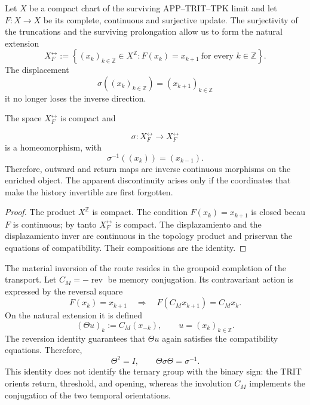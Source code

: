 Let \(X\) be a compact chart of the surviving APP--TRIT--TPK limit and let
\(F:X\to X\) be its complete, continuous and surjective update. The surjectivity of the truncations and the surviving prolongation allow us to form the natural extension
\begin{equation}
 X_F^{\leftrightarrow}
 :=\left\{(x_k)_{k\in\mathbb Z}\in X^{\mathbb Z}:
 F(x_k)=x_{k+1}\ \text{for every }k\in\mathbb Z\right\}.
 \label{p12-83-c19-s1:hmtch:eq-extension-natural-two-way}
\end{equation}
The displacement
\[
 \sigma((x_k)_{k\in\mathbb Z})=(x_{k+1})_{k\in\mathbb Z}
\]
it no longer loses the inverse direction.

\begin{theorem}
\label{p12-83-c19-s1:hmtch:thm-extension-natural-two-way}
The space \(X_F^{\leftrightarrow}\) is compact and

\[
 \sigma:X_F^{\leftrightarrow}\longrightarrow X_F^{\leftrightarrow}
\]
is a homeomorphism, with
\[
 \sigma^{-1}((x_k))=(x_{k-1}).
\]
Therefore, outward and return maps are inverse continuous morphisms on the
enriched object. The apparent discontinuity arises only if the coordinates
that make the history invertible are first forgotten.
\end{theorem}

\begin{proof}
The product \(X^{\mathbb Z}\) is compact. The condition
\(F(x_k)=x_{k+1}\) is closed becau \(F\) is continuous; by tanto
\(X_F^{\leftrightarrow}\) is compact. The displazamiento and the
displazamiento inver are continuous in the topology product and priservan
the equations of compatibility. Their compositions are the identity.
\end{proof}

The material inversion of the route resides in the groupoid completion of
the transport. Let \(C_M=-\operatorname{rev}\) be memory conjugation. Its
contravariant action is expressed by the reversal square
\[
 F(x_k)=x_{k+1}
 \quad\Longrightarrow\quad
 F(C_Mx_{k+1})=C_Mx_k.
\]
On the natural extension it is defined
\begin{equation}
 (\Theta u)_k:=C_M(x_{-k}),
 \qquad u=(x_k)_{k\in\mathbb Z}.
 \label{p12-83-c19-s1:hmtch:eq-definicion-espejo-two-way}
\end{equation}
The reversion identity guarantees that \(\Theta u\) again satisfies
the compatibility equations. Therefore,
\begin{equation}
 \Theta^2=I,
 \qquad
 \Theta\sigma\Theta=\sigma^{-1}.
 \label{p12-83-c19-s1:hmtch:eq-espejo-inversion-two-way}
\end{equation}
This identity does not identify the ternary group with the binary sign: the
TRIT orients return, threshold, and opening, whereas the involution \(C_M\)
implements the conjugation of the two temporal orientations.

